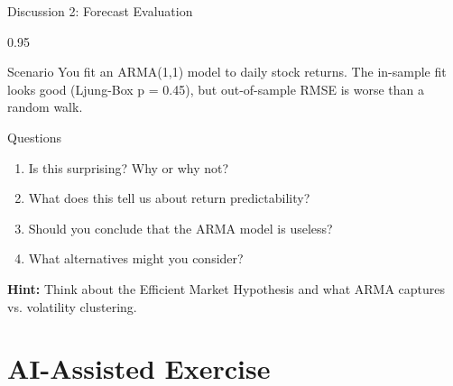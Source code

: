 \documentclass[9pt, aspectratio=169, t]{beamer}
\begin{document}
\begin{frame}{Discussion 2: Forecast Evaluation}
    \begin{cminipage}{0.95\textwidth}
    \begin{block}{Scenario}
        You fit an ARMA(1,1) model to daily stock returns. The in-sample fit looks good (Ljung-Box p = 0.45), but out-of-sample RMSE is worse than a random walk.
    \end{block}

    \vspace{0.2cm}
    \begin{alertblock}{Questions}
        \begin{enumerate}\setlength{\itemsep}{0pt}
            \item Is this surprising? Why or why not?
            \item What does this tell us about return predictability?
            \item Should you conclude that the ARMA model is useless?
            \item What alternatives might you consider?
        \end{enumerate}
    \end{alertblock}

    \vspace{0.2cm}
    {\footnotesize \textbf{Hint:} Think about the Efficient Market Hypothesis and what ARMA captures vs. volatility clustering.}
    \end{cminipage}
\end{frame}

\section{AI-Assisted Exercise}
\end{document}

